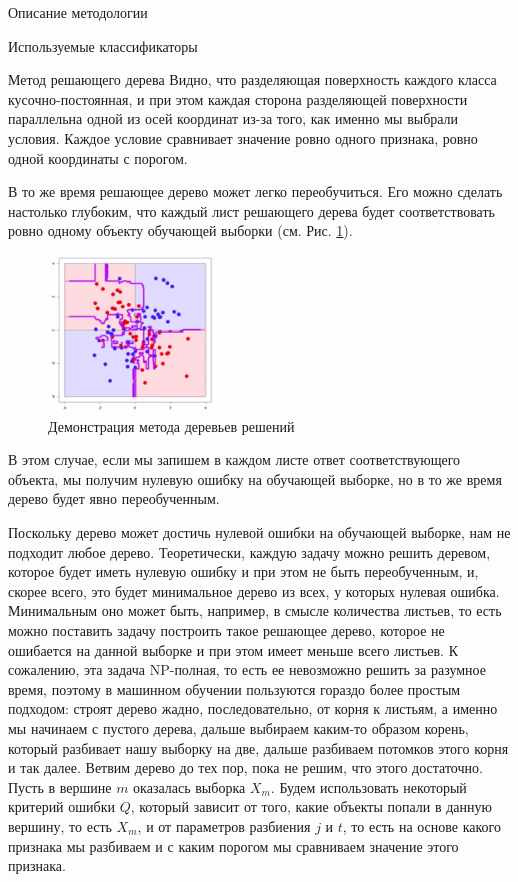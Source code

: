 \begin{section}{Описание методологии}
\begin{subsection}{Используемые классификаторы}
\begin{subsubsection}{Метод решающего дерева}
  Видно, что разделяющая поверхность каждого класса кусочно-постоянная, и при этом каждая сторона разделяющей поверхности параллельна одной из осей координат из-за того, как именно мы выбрали условия. Каждое условие сравнивает значение ровно одного признака, ровно одной координаты с порогом.

  В то же время решающее дерево может легко переобучиться. Его можно сделать настолько глубоким, что каждый лист решающего дерева будет соответствовать ровно одному объекту обучающей выборки (см. Рис. \ref{pic:dt3}).

    \begin{figure}[ht!]
\centering
\includegraphics[width=0.4\textwidth]{pics/dt3}
\caption{Демонстрация метода деревьев решений}
\label{pic:dt3}
\end{figure}

   В этом случае, если мы запишем в каждом листе ответ соответствующего объекта, мы получим нулевую ошибку на обучающей выборке, но в то же время дерево будет явно переобученным.

  Поскольку дерево может достичь нулевой ошибки на обучающей выборке, нам не подходит любое дерево. Теоретически, каждую задачу можно решить деревом, которое будет иметь нулевую ошибку и при этом не быть переобученным, и, скорее всего, это будет минимальное дерево из всех, у которых нулевая ошибка. Минимальным оно может быть, например, в смысле количества листьев, то есть можно поставить задачу построить такое решающее дерево, которое не ошибается на данной выборке и при этом имеет меньше всего листьев. К сожалению, эта задача NP-полная, то есть ее невозможно решить за разумное время, поэтому в машинном обучении пользуются гораздо более простым подходом: строят дерево жадно, последовательно, от корня к листьям, а именно мы начинаем с пустого дерева, дальше выбираем каким-то образом корень, который разбивает нашу выборку на две, дальше разбиваем потомков этого корня и так далее. Ветвим дерево до тех пор, пока не решим, что этого достаточно. Пусть в вершине $m$ оказалась выборка $X_m$. Будем использовать некоторый критерий ошибки $Q$, который зависит от того, какие объекты попали в данную вершину, то есть $X_m$, и от параметров разбиения $j$ и $t$, то есть на основе какого признака мы разбиваем и с каким порогом мы сравниваем значение этого признака.



\end{subsubsection}
\end{subsection}
\end{section}
